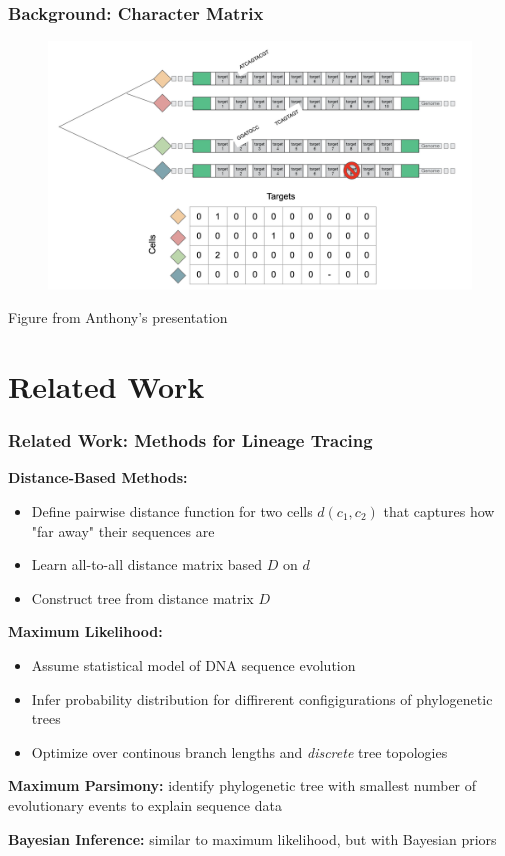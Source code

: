 \documentclass[
	11pt, %
]{beamer}
\begin{document}
\begin{frame}
	\frametitle{Background: Character Matrix}

	\begin{figure}
		\includegraphics[width=0.95\linewidth]{anthony.png}
	\end{figure}

	Figure from Anthony's presentation
\end{frame}

\section{Related Work}

\begin{frame}
	\frametitle{Related Work: Methods for Lineage Tracing}

	\textbf{Distance-Based Methods:}
	\begin{itemize}
		\item Define pairwise distance function for two cells $d(c_1, c_2)$ that captures how "far away" their sequences are
		\item Learn all-to-all distance matrix based $D$ on $d$
		\item Construct tree from distance matrix $D$
	\end{itemize}

	\pause

	\textbf{Maximum Likelihood:}
	\begin{itemize}
		\item Assume statistical model of DNA sequence evolution
		\item Infer probability distribution for diffirerent configigurations of phylogenetic trees
		\item Optimize over continous branch lengths and \emph{discrete} tree topologies
	\end{itemize}

	\pause

	\textbf{Maximum Parsimony:} identify phylogenetic tree with smallest number of evolutionary events to explain sequence data

	\textbf{Bayesian Inference:} similar to maximum likelihood, but with Bayesian priors
\end{frame}
\end{document}
